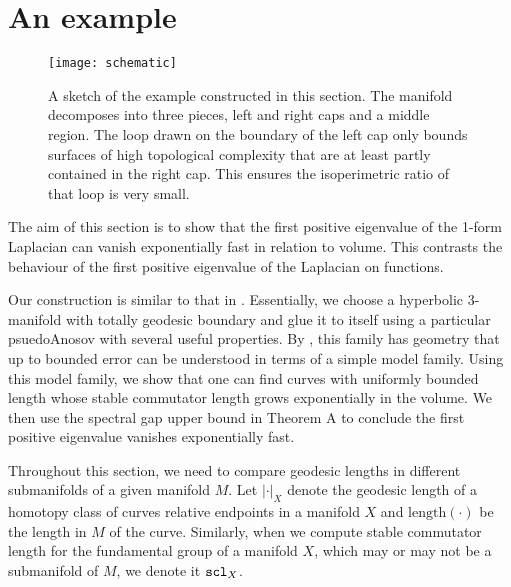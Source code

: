

\section{An example}
\label{sec:6}
\begin{figure}[H]

\texttt{[image: schematic]}
\centering
\caption{ A sketch of the example constructed in this section. The manifold decomposes into three pieces, left and right caps and a middle region. The loop drawn on the boundary of the left cap only bounds surfaces of high topological complexity that are at least partly contained in the right cap. This ensures the isoperimetric ratio of that loop is very small.}
\label{fig:example_sketch}
\end{figure}

The aim of this section is to show that the first positive eigenvalue of the 1-form Laplacian can vanish exponentially fast in relation to volume. This contrasts the behaviour of the first positive eigenvalue of the Laplacian on functions.

Our construction is similar to that in \cite{BD}. Essentially, we choose a hyperbolic 3-manifold with totally geodesic boundary and glue it to itself using a particular psuedoAnosov with several useful properties. By \cite{BMNS}, this family has geometry that up to bounded error can be understood in terms of a simple model family. Using this model family, we show that one can find curves with uniformly bounded length whose stable commutator length grows exponentially in the volume. We then use the spectral gap upper bound in Theorem A to conclude the first positive eigenvalue vanishes exponentially fast.

Throughout this section, we need to compare geodesic lengths in different submanifolds of a given manifold $M$. Let $|\cdot|_{X}$ denote the geodesic length of a homotopy class of curves relative endpoints in a manifold $X$ and $\text{length}(\cdot)$ be the length in $M$ of the curve. Similarly, when we compute stable commutator length for the fundamental group of a manifold $X$, which may or may not be a submanifold of $M$, we denote it $\operatorname{{\tt{scl}}}_X$.

